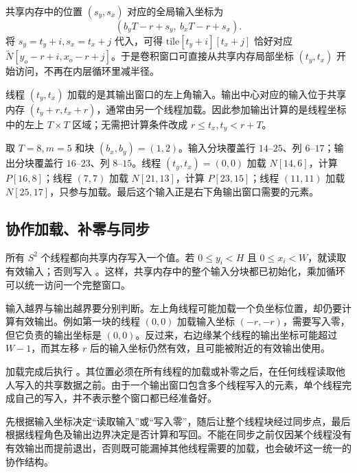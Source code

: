 共享内存中的位置 $(s_y,s_x)$ 对应的全局输入坐标为
\begin{equation}
 (b_yT-r+s_y,\ b_xT-r+s_x).
 \label{l9:eq:shared-to-global}
\end{equation}
将 $s_y=t_y+i,s_x=t_x+j$ 代入，可得 $\mathrm{tile}[t_y+i][t_x+j]$ 恰好对应 $\widetilde N[y_o-r+i,x_o-r+j]$。于是卷积窗口可直接从共享内存局部坐标 $(t_y,t_x)$ 开始访问，不再在内层循环里减半径。

\begin{keybox}[title={加载的元素与输出的中心}]
线程 $(t_y,t_x)$ 加载的是其输出窗口的左上角输入。输出中心对应的输入位于共享内存 $(t_y+r,t_x+r)$，通常由另一个线程加载。因此参加输出计算的是线程坐标中的左上 $T\times T$ 区域；无需把计算条件改成 $r\le t_x,t_y<r+T$。
\end{keybox}

取 $T=8,m=5$ 和块 $(b_x,b_y)=(1,2)$。输入分块覆盖行 $14$--$25$、列 $6$--$17$；输出分块覆盖行 $16$--$23$、列 $8$--$15$。线程 $(t_y,t_x)=(0,0)$ 加载 $N[14,6]$，计算 $P[16,8]$；线程 $(7,7)$ 加载 $N[21,13]$，计算 $P[23,15]$；线程 $(11,11)$ 加载 $N[25,17]$，只参与加载。最后这个输入正是右下角输出窗口需要的元素。

\subsection{协作加载、补零与同步}
所有 $S^2$ 个线程都向共享内存写入一个值。若 $0\le y_i<H$ 且 $0\le x_i<W$，就读取有效输入；否则写入 \mbox{}。这样，共享内存中的整个输入分块都已初始化，乘加循环可以统一访问一个完整窗口。

输入越界与输出越界要分别判断。左上角线程可能加载一个负坐标位置，却仍要计算有效输出。例如第一块的线程 $(0,0)$ 加载输入坐标 $(-r,-r)$，需要写入零，但它负责的输出坐标是 $(0,0)$。反过来，右边缘某个线程的输出坐标可能超过 $W-1$，而其左移 $r$ 后的输入坐标仍然有效，且可能被附近的有效输出使用。

加载完成后执行 \mbox{}。其位置必须在所有线程的加载或补零之后，在任何线程读取他人写入的共享数据之前。由于一个输出窗口包含多个线程写入的元素，单个线程完成自己的写入，并不表示整个窗口都已经准备好。

\begin{keybox}[title={两个判断、一个公共同步点}]
先根据输入坐标决定“读取输入”或“写入零”，随后让整个线程块经过同步点，最后根据线程角色及输出边界决定是否计算和写回。不能在同步之前仅因某个线程没有有效输出而提前退出，否则既可能漏掉其他线程需要的加载，也会破坏这一统一的协作结构。
\end{keybox}

